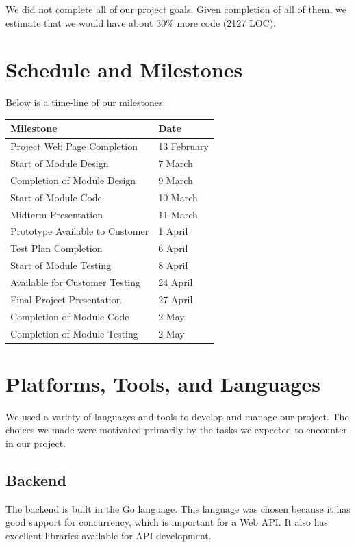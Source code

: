 \documentclass{article}
\begin{document}
We did not complete all of our project goals. Given completion of all of them,
we estimate that we would have about 30\% more code (2127 LOC).

\section{Schedule and Milestones}

Below is a time-line of our milestones:

\begin{center}
  \begin{tabular}{l|l}
    Milestone & Date \\
    \hline
    Project Web Page Completion & 13 February \\
    Start of Module Design & 7 March \\
    Completion of Module Design & 9 March \\
    Start of Module Code & 10 March \\
    Midterm Presentation & 11 March \\
    Prototype Available to Customer & 1 April \\
    Test Plan Completion & 6 April \\
    Start of Module Testing & 8 April \\
    Available for Customer Testing & 24 April \\
    Final Project Presentation & 27 April \\
    Completion of Module Code & 2 May \\
    Completion of Module Testing & 2 May
  \end{tabular}
\end{center}

\section{Platforms, Tools, and Languages}

We used a variety of languages and tools to develop and manage our project. The
choices we made were motivated primarily by the tasks we expected to encounter
in our project.

\subsection{Backend}

The backend is built in the Go language. This language was chosen because it
has good support for concurrency, which is important for a Web API. It also has
excellent libraries available for API development.
\end{document}
